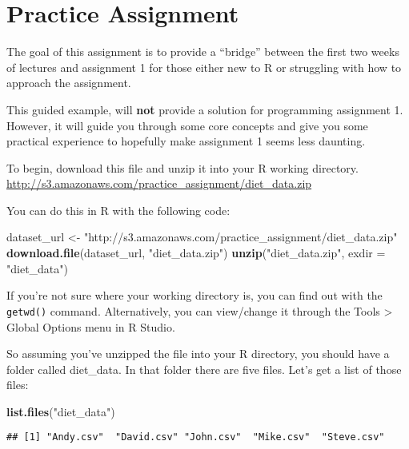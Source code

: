 \documentclass[
]{article}
\date{}
\newenvironment{Shaded}{\begin{snugshade}}{\end{snugshade}}
\newcommand{\DataTypeTok}[1]{\textcolor[rgb]{0.13,0.29,0.53}{#1}}
\newcommand{\KeywordTok}[1]{\textcolor[rgb]{0.13,0.29,0.53}{\textbf{#1}}}
\newcommand{\NormalTok}[1]{#1}
\newcommand{\StringTok}[1]{\textcolor[rgb]{0.31,0.60,0.02}{#1}}
\begin{document}
\hypertarget{practice-assignment}{%
\section{Practice Assignment}\label{practice-assignment}}

The goal of this assignment is to provide a ``bridge'' between the first
two weeks of lectures and assignment 1 for those either new to R or
struggling with how to approach the assignment.

This guided example, will \textbf{not} provide a solution for
programming assignment 1. However, it will guide you through some core
concepts and give you some practical experience to hopefully make
assignment 1 seems less daunting.

To begin, download this file and unzip it into your R working
directory.\\
\url{http://s3.amazonaws.com/practice_assignment/diet_data.zip}

You can do this in R with the following code:

\begin{Shaded}
\begin{Highlighting}[]
\NormalTok{dataset_url <-}\StringTok{ "http://s3.amazonaws.com/practice_assignment/diet_data.zip"}
\KeywordTok{download.file}\NormalTok{(dataset_url, }\StringTok{"diet_data.zip"}\NormalTok{)}
\KeywordTok{unzip}\NormalTok{(}\StringTok{"diet_data.zip"}\NormalTok{, }\DataTypeTok{exdir =} \StringTok{"diet_data"}\NormalTok{)}
\end{Highlighting}
\end{Shaded}

If you're not sure where your working directory is, you can find out
with the \texttt{getwd()} command. Alternatively, you can view/change it
through the Tools \textgreater{} Global Options menu in R Studio.

So assuming you've unzipped the file into your R directory, you should
have a folder called diet\_data. In that folder there are five files.
Let's get a list of those files:

\begin{Shaded}
\begin{Highlighting}[]
\KeywordTok{list.files}\NormalTok{(}\StringTok{"diet_data"}\NormalTok{)}
\end{Highlighting}
\end{Shaded}

\begin{verbatim}
## [1] "Andy.csv"  "David.csv" "John.csv"  "Mike.csv"  "Steve.csv"
\end{verbatim}
\end{document}
